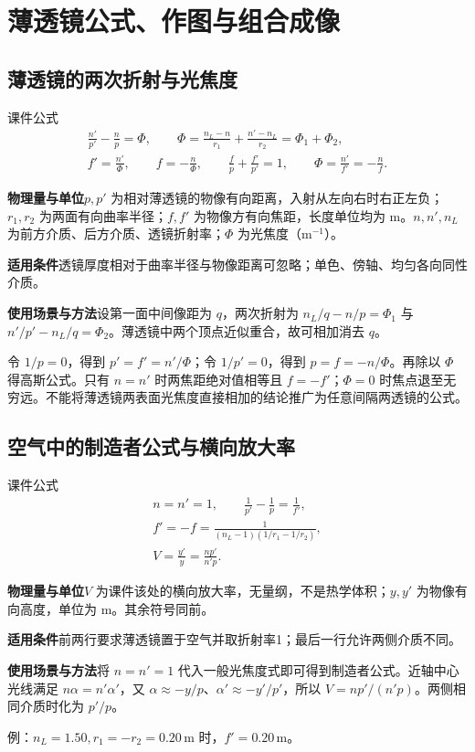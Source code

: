\documentclass[UTF8,fontset=none,zihao=-4,a4paper]{ctexart}
\newcommand{\chapterpage}[1]{\clearpage\section{#1}}
\newcommand{\unit}[1]{\,\mathrm{#1}}
\newcommand{\explain}[3]{\par\noindent\textbf{物理量与单位}\quad #1\par
\noindent\textbf{适用条件}\quad #2\par
\noindent\textbf{使用场景与方法}\quad #3\par}
\begin{document}
\chapterpage{薄透镜公式、作图与组合成像}
\subsection{薄透镜的两次折射与光焦度}
\begin{infobox}[breakable=false]{课件公式}
\begin{gather*}
 \frac{n'}{p'}-\frac np=\Phi,\qquad
 \Phi=\frac{n_L-n}{r_1}+\frac{n'-n_L}{r_2}=\Phi_1+\Phi_2,\\
 f'=\frac{n'}\Phi,\qquad f=-\frac n\Phi,\qquad
 \frac f p+\frac{f'}{p'}=1,\qquad
 \Phi=\frac{n'}{f'}=-\frac n f.
\end{gather*}
\end{infobox}
\explain{$p,p'$ 为相对薄透镜的物像有向距离，入射从左向右时右正左负；$r_1,r_2$ 为两面有向曲率半径；$f,f'$ 为物像方有向焦距，长度单位均为 m。$n,n',n_L$ 为前方介质、后方介质、透镜折射率；$\Phi$ 为光焦度（$\mathrm{m^{-1}}$）。}{透镜厚度相对于曲率半径与物像距离可忽略；单色、傍轴、均匀各向同性介质。}{设第一面中间像距为 $q$，两次折射为 $n_L/q-n/p=\Phi_1$ 与 $n'/p'-n_L/q=\Phi_2$。薄透镜中两个顶点近似重合，故可相加消去 $q$。}
令 $1/p=0$，得到 $p'=f'=n'/\Phi$；令 $1/p'=0$，得到 $p=f=-n/\Phi$。再除以 $\Phi$ 得高斯公式。只有 $n=n'$ 时两焦距绝对值相等且 $f=-f'$；$\Phi=0$ 时焦点退至无穷远。不能将薄透镜两表面光焦度直接相加的结论推广为任意间隔两透镜的公式。

\subsection{空气中的制造者公式与横向放大率}
\begin{infobox}[breakable=false]{课件公式}
\begin{gather*}
 n=n'=1,\qquad \frac1{p'}-\frac1p=\frac1{f'},\\
 f'=-f=\frac1{(n_L-1)(1/r_1-1/r_2)},\\
 V=\frac{y'}y=\frac{np'}{n'p}.
\end{gather*}
\end{infobox}
\explain{$V$ 为课件该处的横向放大率，无量纲，不是热学体积；$y,y'$ 为物像有向高度，单位为 m。其余符号同前。}{前两行要求薄透镜置于空气并取折射率1；最后一行允许两侧介质不同。}{将 $n=n'=1$ 代入一般光焦度式即可得到制造者公式。近轴中心光线满足 $n\alpha=n'\alpha'$，又 $\alpha\approx-y/p$、$\alpha'\approx-y'/p'$，所以 $V=np'/(n'p)$。两侧相同介质时化为 $p'/p$。}
例：$n_L=1.50,r_1=-r_2=0.20\unit m$ 时，$f'=0.20\unit m$。
\end{document}
